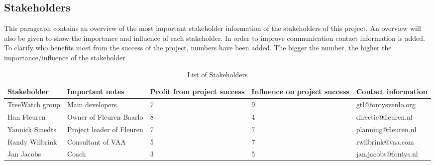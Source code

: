 \subsection{Stakeholders}
This paragraph contains an overview of the most important stakeholder information of the stakeholders of this project. An overview will also be given to show the importance and influence of each stakeholder. In order to improve communication contact information is added. To clarify who benefits most from the success of the project, numbers have been added. The bigger the number, the higher the importance/influence of the stakeholder.

\begin{table}[htbp]
	{
		\begin{tabular}{ p{}  p{3cm}  p{1,5cm}  p{}  p{} }
			Stakeholder & Important notes & Profit from project success & Influence on project success & Contact information \\\hline
			TreeWatch group & Main developers & 7 & 9 & gtl@fontysvenlo.org \\
			Han Fleuren & Owner of Fleuren Baarlo & 8 & 4 & directie@fleuren.nl \\
			Yannick Smedts & Project leader of Fleuren & 7 & 7 & planning@fleuren.nl \\
			Randy Wilbrink & Consultant of VAA & 5 & 7 & rwilbrink@vaa.com \\
			Jan Jacobs & Coach & 3 & 5 & jan.jacobs@fontys.nl \\
		\end{tabular}
	}
	\caption{List of Stakeholders\label{stakeholders}}
\end{table}
